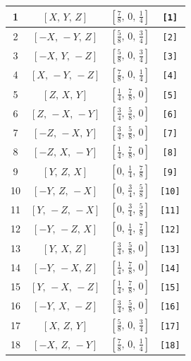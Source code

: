 \documentclass[fleqn,8pt]{jsarticle}
\begin{document}
\begin{longtable}{cccc}
1 & $\left[ X,\, Y,\, Z \right]$ & $\left[ \frac{7}{8},\, 0,\, \frac{1}{4} \right]$ & {\tt [1]} \\ \hline
2 & $\left[ - X,\, - Y,\, Z \right]$ & $\left[ \frac{5}{8},\, 0,\, \frac{3}{4} \right]$ & {\tt [2]} \\ \hline
3 & $\left[ - X,\, Y,\, - Z \right]$ & $\left[ \frac{5}{8},\, 0,\, \frac{3}{4} \right]$ & {\tt [3]} \\ \hline
4 & $\left[ X,\, - Y,\, - Z \right]$ & $\left[ \frac{7}{8},\, 0,\, \frac{1}{4} \right]$ & {\tt [4]} \\ \hline
5 & $\left[ Z,\, X,\, Y \right]$ & $\left[ \frac{1}{4},\, \frac{7}{8},\, 0 \right]$ & {\tt [5]} \\ \hline
6 & $\left[ Z,\, - X,\, - Y \right]$ & $\left[ \frac{3}{4},\, \frac{5}{8},\, 0 \right]$ & {\tt [6]} \\ \hline
7 & $\left[ - Z,\, - X,\, Y \right]$ & $\left[ \frac{3}{4},\, \frac{5}{8},\, 0 \right]$ & {\tt [7]} \\ \hline
8 & $\left[ - Z,\, X,\, - Y \right]$ & $\left[ \frac{1}{4},\, \frac{7}{8},\, 0 \right]$ & {\tt [8]} \\ \hline
9 & $\left[ Y,\, Z,\, X \right]$ & $\left[ 0,\, \frac{1}{4},\, \frac{7}{8} \right]$ & {\tt [9]} \\ \hline
10 & $\left[ - Y,\, Z,\, - X \right]$ & $\left[ 0,\, \frac{3}{4},\, \frac{5}{8} \right]$ & {\tt [10]} \\ \hline
11 & $\left[ Y,\, - Z,\, - X \right]$ & $\left[ 0,\, \frac{3}{4},\, \frac{5}{8} \right]$ & {\tt [11]} \\ \hline
12 & $\left[ - Y,\, - Z,\, X \right]$ & $\left[ 0,\, \frac{1}{4},\, \frac{7}{8} \right]$ & {\tt [12]} \\ \hline
13 & $\left[ Y,\, X,\, Z \right]$ & $\left[ \frac{3}{4},\, \frac{5}{8},\, 0 \right]$ & {\tt [13]} \\ \hline
14 & $\left[ - Y,\, - X,\, Z \right]$ & $\left[ \frac{1}{4},\, \frac{7}{8},\, 0 \right]$ & {\tt [14]} \\ \hline
15 & $\left[ Y,\, - X,\, - Z \right]$ & $\left[ \frac{1}{4},\, \frac{7}{8},\, 0 \right]$ & {\tt [15]} \\ \hline
16 & $\left[ - Y,\, X,\, - Z \right]$ & $\left[ \frac{3}{4},\, \frac{5}{8},\, 0 \right]$ & {\tt [16]} \\ \hline
17 & $\left[ X,\, Z,\, Y \right]$ & $\left[ \frac{5}{8},\, 0,\, \frac{3}{4} \right]$ & {\tt [17]} \\ \hline
18 & $\left[ - X,\, Z,\, - Y \right]$ & $\left[ \frac{7}{8},\, 0,\, \frac{1}{4} \right]$ & {\tt [18]} \\ \hline

\end{longtable}
\end{document}
